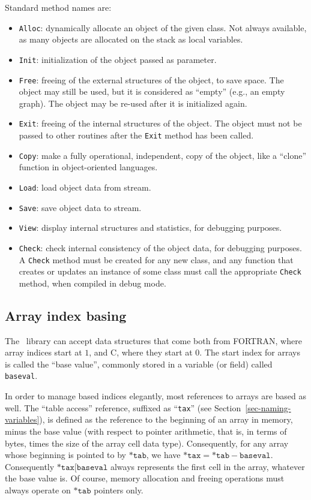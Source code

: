 Standard method names are:
\begin{itemize}
\item
\texttt{Alloc}: dynamically allocate an object of the given class. Not
always available, as many objects are allocated on the stack as local
variables.
\item
\texttt{Init}: initialization of the object passed as parameter.
\item
\texttt{Free}: freeing of the external structures of the object, to save
space. The object may still be used, but it is considered as ``empty''
(e.g., an empty graph). The object may be re-used after it is
initialized again.
\item
\texttt{Exit}: freeing of the internal structures of the object. The
object must not be passed to other routines after the \texttt{Exit}
method has been called.
\item
\texttt{Copy}: make a fully operational, independent, copy of the
object, like a ``clone'' function in object-oriented languages.
\item
\texttt{Load}: load object data from stream.
\item
\texttt{Save}: save object data to stream.
\item
\texttt{View}: display internal structures and statistics, for debugging
purposes.
\item
\texttt{Check}: check internal consistency of the object data, for
debugging purposes. A \texttt{Check} method must be created for any
new class, and any function that creates or updates an instance of
some class must call the appropriate \texttt{Check} method, when
compiled in debug mode.
\end{itemize}

\subsection{Array index basing}
\label{sec-basing}

The \libscotch\ library can accept data structures that come both from
FORTRAN, where array indices start at $1$, and C, where they start at
$0$. The start index for arrays is called the ``base value'', commonly
stored in a variable (or field) called \texttt{baseval}.

In order to manage based indices elegantly, most references to arrays
are based as well. The ``table access'' reference, suffixed as
``\texttt{tax}'' (see Section~\ref{sec-naming-variables}), is defined
as the reference to the beginning of an array in memory, minus the
base value (with respect to pointer arithmetic, that is, in terms of
bytes, times the size of the array cell data type). Consequently, for
any array whose beginning is pointed to by $\mathtt{*tab}$, we have
$\mathtt{*tax} = \mathtt{*tab} - \mathtt{baseval}$.
Consequently $\mathtt{*tax[baseval}$ always represents the first
cell in the array, whatever the base value is.
Of course, memory allocation and freeing operations must always
operate on $\mathtt{*tab}$ pointers only.


